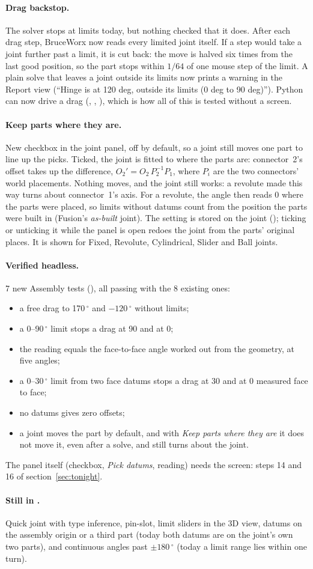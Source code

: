 \paragraph{Drag backstop.} The solver stops at limits today, but nothing checked that it does. After each drag step,
BruceWorx now reads every limited joint itself. If a step would take a joint further past a limit, it is cut back:
the move is halved six times from the last good position, so the part stops within $1/64$ of one mouse step of the
limit. A plain solve that leaves a joint outside its limits now prints a warning in the Report view (``Hinge is at
120 deg, outside its limits (0 deg to 90 deg)''). Python can now drive a drag (, ,
), which is how all of this is tested without a screen.

\paragraph{Keep parts where they are.} New checkbox in the joint panel, off by default, so a joint still moves one part
to line up the picks. Ticked, the joint is fitted to where the parts are: connector~2's offset takes up the
difference, $O_2' = O_2\,P_2^{-1}P_1$, where $P_i$ are the two connectors' world placements. Nothing moves, and the
joint still works: a revolute made this way turns about connector~1's axis. For a revolute, the angle then reads 0
where the parts were placed, so limits without datums count from the position the parts were built in (Fusion's
\emph{as-built} joint). The setting is stored on the joint (); ticking or unticking it while the
panel is open redoes the joint from the parts' original places. It is shown for Fixed, Revolute, Cylindrical, Slider
and Ball joints.

\paragraph{Verified headless.} 7 new Assembly tests (), all passing with the 8
existing ones:
\begin{itemize}[nosep]
  \item a free drag to 170\,$^\circ$ and $-120\,^\circ$ without limits;
  \item a 0--90\,$^\circ$ limit stops a drag at 90 and at 0;
  \item the reading equals the face-to-face angle worked out from the geometry, at five angles;
  \item a 0--30\,$^\circ$ limit from two face datums stops a drag at 30 and at 0 measured face to face;
  \item no datums gives zero offsets;
  \item a joint moves the part by default, and with \emph{Keep parts where they are} it does not move it, even after a
        solve, and still turns about the joint.
\end{itemize}
The panel itself (checkbox, \emph{Pick datums}, reading) needs the screen: steps 14 and 16 of
section~\ref{sec:tonight}.

\paragraph{Still in .} Quick joint with type inference, pin-slot, limit sliders in the 3D view, datums on
the assembly origin or a third part (today both datums are on the joint's own two parts), and continuous angles past
$\pm 180\,^\circ$ (today a limit range lies within one turn).
